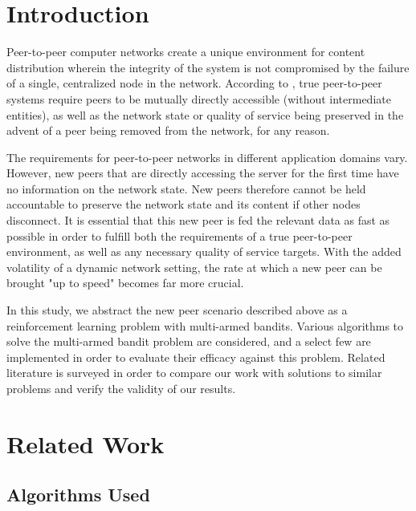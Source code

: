 \documentclass{article}
\begin{document}
\section{Introduction}
Peer-to-peer computer networks create a unique environment for content distribution wherein the integrity of the system is not compromised by the failure of 
a single, centralized node in the network. According to \cite{p2p_def}, true peer-to-peer systems require peers to be mutually directly accessible (without 
intermediate entities), as well as the network state or quality of service being preserved in the advent of a peer being removed from the network, for any 
reason.

The requirements for peer-to-peer networks in different application domains vary. However, new peers that are directly accessing the server for the first time 
have no information on the network state. New peers therefore cannot be held accountable to preserve the network state and its content if other nodes disconnect. 
It is essential that this new peer is fed the relevant data as fast as possible in order to fulfill both the requirements of a true peer-to-peer environment, as 
well as any necessary quality of service targets. With the added volatility of a dynamic network setting, the rate at which a new peer can be brought "up to speed" 
becomes far more crucial.

In this study, we abstract the new peer scenario described above as a reinforcement learning problem with multi-armed bandits. Various algorithms to solve 
the multi-armed bandit problem are considered, and a select few are implemented in order to evaluate their efficacy against this problem. Related literature 
is surveyed in order to compare our work with solutions to similar problems and verify the validity of our results.

\section{Related Work}

\subsection{Algorithms Used}
\end{document}
